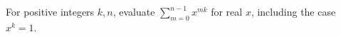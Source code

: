 For positive integers $k,n$, evaluate $\displaystyle\sum_{m=0}^{n-1}x^{mk}$ for real $x$, including the case $x^k=1$.
